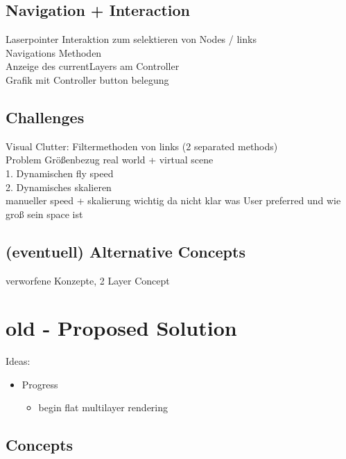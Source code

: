 \section{Navigation + Interaction}

Laserpointer Interaktion zum selektieren von Nodes / links\\
Navigations Methoden\\
Anzeige des currentLayers am Controller\\
Grafik mit Controller button belegung\\

\section{Challenges}

Visual Clutter: Filtermethoden von links (2 separated methods)\\

Problem Größenbezug real world + virtual scene\\
1. Dynamischen fly speed\\
2. Dynamisches skalieren\\
manueller speed + skalierung wichtig da nicht klar was User preferred und wie groß sein space ist\\ 


\section{(eventuell) Alternative Concepts}

verworfene Konzepte, 2 Layer Concept\\

\chapter{old - Proposed Solution}
Ideas:
\begin{itemize}
    \item Progress
        \begin{itemize}
            \item begin flat multilayer rendering
        \end{itemize}
\end{itemize}

\section{Concepts}

